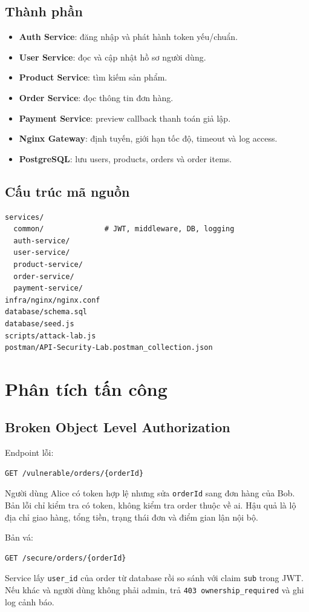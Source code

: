 \documentclass[12pt,a4paper]{report}
\begin{document}
\section{Thành phần}
\begin{itemize}
  \item \textbf{Auth Service}: đăng nhập và phát hành token yếu/chuẩn.
  \item \textbf{User Service}: đọc và cập nhật hồ sơ người dùng.
  \item \textbf{Product Service}: tìm kiếm sản phẩm.
  \item \textbf{Order Service}: đọc thông tin đơn hàng.
  \item \textbf{Payment Service}: preview callback thanh toán giả lập.
  \item \textbf{Nginx Gateway}: định tuyến, giới hạn tốc độ, timeout và log access.
  \item \textbf{PostgreSQL}: lưu users, products, orders và order items.
\end{itemize}

\section{Cấu trúc mã nguồn}
\begin{lstlisting}
services/
  common/              # JWT, middleware, DB, logging
  auth-service/
  user-service/
  product-service/
  order-service/
  payment-service/
infra/nginx/nginx.conf
database/schema.sql
database/seed.js
scripts/attack-lab.js
postman/API-Security-Lab.postman_collection.json
\end{lstlisting}

\chapter{Phân tích tấn công}

\section{Broken Object Level Authorization}
Endpoint lỗi:
\begin{lstlisting}
GET /vulnerable/orders/{orderId}
\end{lstlisting}
Người dùng Alice có token hợp lệ nhưng sửa \texttt{orderId} sang đơn hàng của Bob. Bản lỗi chỉ kiểm tra có token, không kiểm tra order thuộc về ai. Hậu quả là lộ địa chỉ giao hàng, tổng tiền, trạng thái đơn và điểm gian lận nội bộ.

Bản vá:
\begin{lstlisting}
GET /secure/orders/{orderId}
\end{lstlisting}
Service lấy \texttt{user\_id} của order từ database rồi so sánh với claim \texttt{sub} trong JWT. Nếu khác và người dùng không phải admin, trả \texttt{403 ownership\_required} và ghi log cảnh báo.
\end{document}
